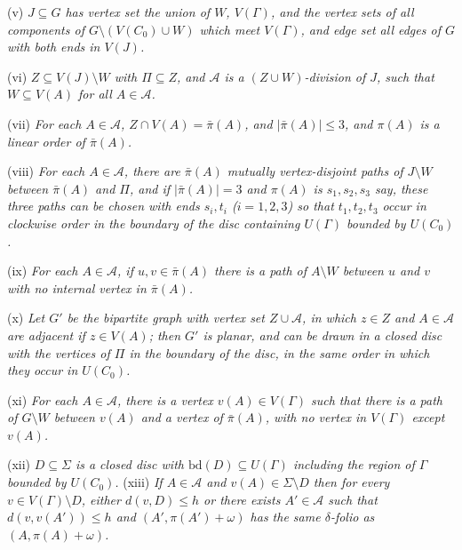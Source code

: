 \hspace*{12pt}(v) \textit{$J \subseteq G$ has vertex set the union of $W$, $V(\Gamma)$, and the vertex sets of all components of $G \setminus (V(C_0) \cup W)$ which meet $V(\Gamma)$, and edge set all edges of $G$ with both ends in $V(J)$.}

\hspace*{12pt}(vi) \textit{$Z \subseteq V(J) \setminus W$ with $\Pi \subseteq Z$, and $\mathcal{A}$ is a $(Z \cup W)$-division of $J$, such that $W \subseteq V(A)$ for all $A \in \mathcal{A}$.}

\hspace*{12pt}(vii) \textit{For each $A \in \mathcal{A}$, $Z \cap V(A) = \bar{\pi}(A)$, and $|\bar{\pi}(A)| \le 3$, and $\pi(A)$ is a linear order of $\bar{\pi}(A)$.}

\hspace*{12pt}(viii) \textit{For each $A \in \mathcal{A}$, there are $\bar{\pi}(A)$ mutually vertex-disjoint paths of $J \setminus W$ between $\bar{\pi}(A)$ and $\Pi$, and if $|\bar{\pi}(A)| = 3$ and $\pi(A)$ is $s_1, s_2, s_3$ say, these three paths can be chosen with ends $s_i, t_i$ ($i = 1, 2, 3$) so that $t_1, t_2, t_3$ occur in clockwise order in the boundary of the disc containing $U(\Gamma)$ bounded by $U(C_0)$.}

\hspace*{12pt}(ix) \textit{For each $A \in \mathcal{A}$, if $u, v \in \bar{\pi}(A)$ there is a path of $A \setminus W$ between $u$ and $v$ with no internal vertex in $\bar{\pi}(A)$.}

\hspace*{12pt}(x) \textit{Let $G'$ be the bipartite graph with vertex set $Z \cup \mathcal{A}$, in which $z \in Z$ and $A \in \mathcal{A}$ are adjacent if $z \in V(A)$; then $G'$ is planar, and can be drawn in a closed disc with the vertices of $\Pi$ in the boundary of the disc, in the same order in which they occur in $U(C_0)$.}

(xi) \textit{For each $A \in \mathcal{A}$, there is a vertex $v(A) \in V(\Gamma)$ such that there is a path of $G \setminus W$ between $v(A)$ and a vertex of $\bar{\pi}(A)$, with no vertex in $V(\Gamma)$ except $v(A)$.}

(xii) \textit{$D \subseteq \Sigma$ is a closed disc with $\text{bd}(D) \subseteq U(\Gamma)$ including the region of $\Gamma$ bounded by $U(C_0)$.} (xiii) \textit{If $A \in \mathcal{A}$ and $v(A) \in \Sigma \setminus D$ then for every $v \in V(\Gamma) \setminus D$, either $d(v, D) \le h$ or there exists $A' \in \mathcal{A}$ such that $d(v, v(A')) \le h$ and $(A', \pi(A') + \omega)$ has the same $\delta$-folio as $(A, \pi(A) + \omega)$.}

